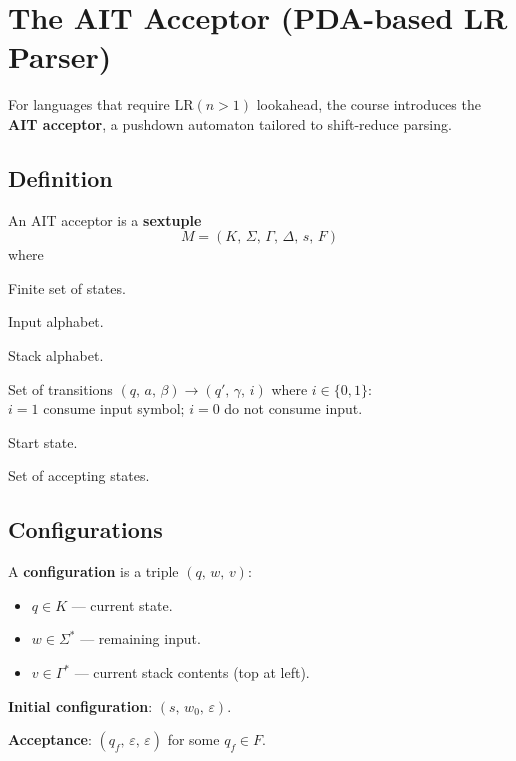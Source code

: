 \documentclass[12pt,a4paper]{article}
\begin{document}
\section{The AIT Acceptor (PDA-based LR Parser)}

For languages that require $\text{LR}(n > 1)$ lookahead, the course introduces
the \textbf{AIT acceptor}, a pushdown automaton tailored to shift-reduce parsing.

\subsection{Definition}

An AIT acceptor is a \textbf{sextuple}
\[
M = (K,\, \Sigma,\, \Gamma,\, \Delta,\, s,\, F)
\]
where
\begin{description}[leftmargin=2cm]
  \item[$K$] Finite set of states.
  \item[$\Sigma$] Input alphabet.
  \item[$\Gamma$] Stack alphabet.
  \item[$\Delta$] Set of transitions
        $(q,\, a,\, \beta) \to (q',\, \gamma,\, i)$
        where $i \in \{0, 1\}$:\\
        $i=1$ consume input symbol; $i=0$ do not consume input.
  \item[$s$] Start state.
  \item[$F$] Set of accepting states.
\end{description}

\subsection{Configurations}

A \textbf{configuration} is a triple $(q,\, w,\, v)$:
\begin{itemize}
  \item $q \in K$ --- current state.
  \item $w \in \Sigma^*$ --- remaining input.
  \item $v \in \Gamma^*$ --- current stack contents (top at left).
\end{itemize}

\textbf{Initial configuration}: $(s,\, w_0,\, \varepsilon)$.

\textbf{Acceptance}: $(q_f,\, \varepsilon,\, \varepsilon)$ for some $q_f \in F$.
\end{document}
